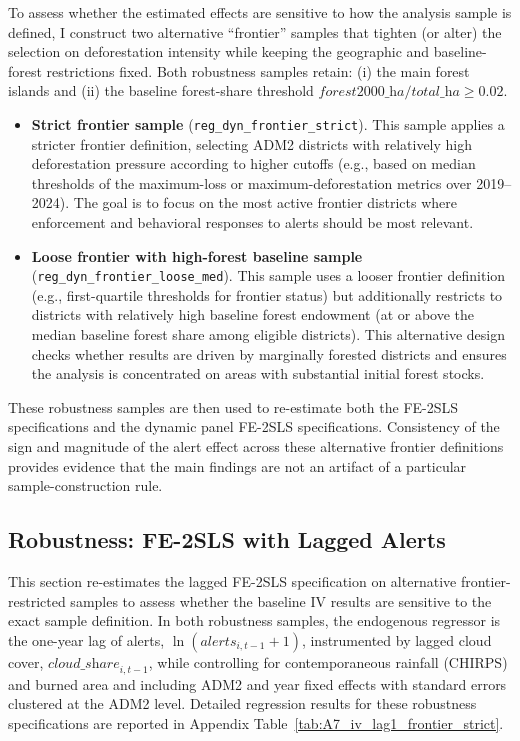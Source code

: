 \documentclass[hidelinks,12pt]{article}
\begin{document}
To assess whether the estimated effects are sensitive to how the analysis sample is defined, I construct two alternative ``frontier'' samples that tighten (or alter) the selection on deforestation intensity while keeping the geographic and baseline-forest restrictions fixed. Both robustness samples retain: (i) the main forest islands and (ii) the baseline forest-share threshold $\textit{forest2000\_ha}/\textit{total\_ha} \ge 0.02$.

\begin{itemize}
  \item \textbf{Strict frontier sample} (\texttt{reg\_dyn\_frontier\_strict}).  
  This sample applies a stricter frontier definition, selecting ADM2 districts with relatively high deforestation pressure according to higher cutoffs (e.g., based on median thresholds of the maximum-loss or maximum-deforestation metrics over 2019--2024). The goal is to focus on the most active frontier districts where enforcement and behavioral responses to alerts should be most relevant.

  \item \textbf{Loose frontier with high-forest baseline sample} (\texttt{reg\_dyn\_frontier\_loose\_med}).  
  This sample uses a looser frontier definition (e.g., first-quartile thresholds for frontier status) but additionally restricts to districts with relatively high baseline forest endowment (at or above the median baseline forest share among eligible districts). This alternative design checks whether results are driven by marginally forested districts and ensures the analysis is concentrated on areas with substantial initial forest stocks.
\end{itemize}

These robustness samples are then used to re-estimate both the FE-2SLS specifications and the dynamic panel FE-2SLS specifications. Consistency of the sign and magnitude of the alert effect across these alternative frontier definitions provides evidence that the main findings are not an artifact of a particular sample-construction rule.


\subsection{Robustness: FE-2SLS with Lagged Alerts}
\label{sec:robust_2sls}

This section re-estimates the lagged FE-2SLS specification on alternative frontier-restricted samples to assess whether the baseline IV results are sensitive to the exact sample definition. In both robustness samples, the endogenous regressor is the one-year lag of alerts, $\ln(\textit{alerts}_{i,t-1}+1)$, instrumented by lagged cloud cover, $\textit{cloud\_share}_{i,t-1}$, while controlling for contemporaneous rainfall (CHIRPS) and burned area and including ADM2 and year fixed effects with standard errors clustered at the ADM2 level. Detailed regression results for these robustness specifications are reported in Appendix Table~\ref{tab:A7_iv_lag1_frontier_strict}.
\end{document}
